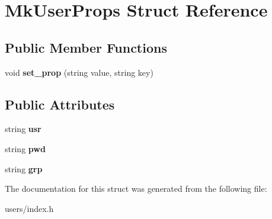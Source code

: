 \hypertarget{structMkUserProps}{}\section{Mk\+User\+Props Struct Reference}
\label{structMkUserProps}
\subsection*{Public Member Functions}
\begin{DoxyCompactItemize}
\item 
\mbox{\label{structMkUserProps_a88f46764ef6961838a5e1e2c3f9cb1e6}} 
void {\bfseries set\+\_\+prop} (string value, string key)
\end{DoxyCompactItemize}
\subsection*{Public Attributes}
\begin{DoxyCompactItemize}
\item 
\mbox{\label{structMkUserProps_affa4c6a7223e3b99ab81cf9cce734f8a}} 
string {\bfseries usr}
\item 
\mbox{\label{structMkUserProps_a0bd374781644c54fa0912eeeb475697f}} 
string {\bfseries pwd}
\item 
\mbox{\label{structMkUserProps_af5ebdee0dbf515f4eb0532ce17a3a93a}} 
string {\bfseries grp}
\end{DoxyCompactItemize}


The documentation for this struct was generated from the following file\+:\begin{DoxyCompactItemize}
\item 
users/index.\+h\end{DoxyCompactItemize}
